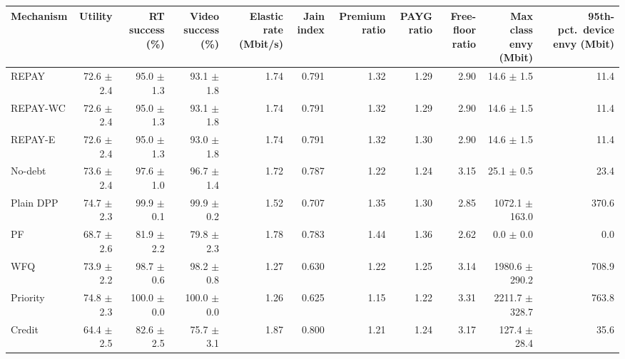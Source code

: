 \begin{tabular}{lrrrrrrrrrr}
\toprule
Mechanism & Utility & RT success (\%) & Video success (\%) & Elastic rate (Mbit/s) & Jain index & Premium ratio & PAYG ratio & Free-floor ratio & Max class envy (Mbit) & 95th-pct.\ device envy (Mbit) \\
\midrule
REPAY & 72.6 $\pm$ 2.4 & 95.0 $\pm$ 1.3 & 93.1 $\pm$ 1.8 & 1.74 & 0.791 & 1.32 & 1.29 & 2.90 & 14.6 $\pm$ 1.5 & 11.4 \\
REPAY-WC & 72.6 $\pm$ 2.4 & 95.0 $\pm$ 1.3 & 93.1 $\pm$ 1.8 & 1.74 & 0.791 & 1.32 & 1.29 & 2.90 & 14.6 $\pm$ 1.5 & 11.4 \\
REPAY-E & 72.6 $\pm$ 2.4 & 95.0 $\pm$ 1.3 & 93.0 $\pm$ 1.8 & 1.74 & 0.791 & 1.32 & 1.30 & 2.90 & 14.6 $\pm$ 1.5 & 11.4 \\
No-debt & 73.6 $\pm$ 2.4 & 97.6 $\pm$ 1.0 & 96.7 $\pm$ 1.4 & 1.72 & 0.787 & 1.22 & 1.24 & 3.15 & 25.1 $\pm$ 0.5 & 23.4 \\
Plain DPP & 74.7 $\pm$ 2.3 & 99.9 $\pm$ 0.1 & 99.9 $\pm$ 0.2 & 1.52 & 0.707 & 1.35 & 1.30 & 2.85 & 1072.1 $\pm$ 163.0 & 370.6 \\
PF & 68.7 $\pm$ 2.6 & 81.9 $\pm$ 2.2 & 79.8 $\pm$ 2.3 & 1.78 & 0.783 & 1.44 & 1.36 & 2.62 & 0.0 $\pm$ 0.0 & 0.0 \\
WFQ & 73.9 $\pm$ 2.2 & 98.7 $\pm$ 0.6 & 98.2 $\pm$ 0.8 & 1.27 & 0.630 & 1.22 & 1.25 & 3.14 & 1980.6 $\pm$ 290.2 & 708.9 \\
Priority & 74.8 $\pm$ 2.3 & 100.0 $\pm$ 0.0 & 100.0 $\pm$ 0.0 & 1.26 & 0.625 & 1.15 & 1.22 & 3.31 & 2211.7 $\pm$ 328.7 & 763.8 \\
Credit & 64.4 $\pm$ 2.5 & 82.6 $\pm$ 2.5 & 75.7 $\pm$ 3.1 & 1.87 & 0.800 & 1.21 & 1.24 & 3.17 & 127.4 $\pm$ 28.4 & 35.6 \\
\bottomrule
\end{tabular}
